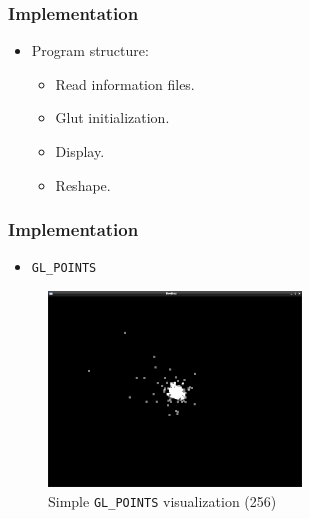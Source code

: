 \begin{frame}
    \frametitle{Implementation}
    \begin{itemize}
        \item Program structure:
        \begin{itemize}
            \item Read information files.
            \item Glut initialization.
            \item Display.
            \item Reshape.
        \end{itemize}
    \end{itemize}
\end{frame}

\begin{frame}
    \frametitle{Implementation}
    \begin{itemize}
        \item \texttt{GL\_POINTS}
    \end{itemize}
    \begin{figure}
        \begin{center}
           \includegraphics[width=0.6\textwidth]{img/bodies_sin_textura} 
        \end{center}
        \caption{Simple \texttt{GL\_POINTS} visualization (256)}
    \end{figure}
\end{frame}

